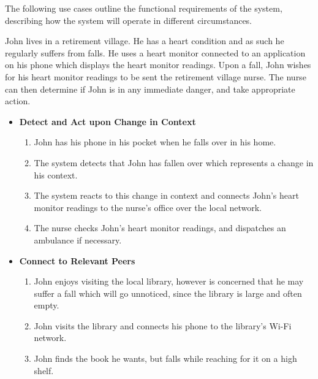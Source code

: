 \documentclass[12pt,twoside,notitlepage]{report}
\begin{document}
The following use cases outline the functional requirements of the system, describing how the system will operate in different circumstances.

John lives in a retirement village. He has a heart condition and as such he regularly suffers from falls. He uses a heart monitor connected to an application on his phone which displays the heart monitor readings. Upon a fall, John wishes for his heart monitor readings to be sent the retirement village nurse. The nurse can then determine if John is in any immediate danger, and take appropriate action.

\begin{itemize}

\item {\bf Detect and Act upon Change in Context}

\begin{enumerate}

\item John has his phone in his pocket when he falls over in his home.

\item The system detects that John has fallen over which represents a change in his context.

\item The system reacts to this change in context and connects John's heart monitor readings to the nurse's office over the local network.

\item The nurse checks John's heart monitor readings, and dispatches an ambulance if necessary.

\end{enumerate}

\item {\bf Connect to Relevant Peers}

\begin{enumerate}

\item John enjoys visiting the local library, however is concerned that he may suffer a fall which will go unnoticed, since the library is large and often empty.

\item John visits the library and connects his phone to the library's Wi-Fi network.

\item John finds the book he wants, but falls while reaching for it on a high shelf.


\end{enumerate}
\end{itemize}
\end{document}
